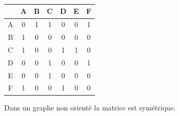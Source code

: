 \documentclass[svgnames,11pt]{beamer}
\begin{document}
\begin{frame}
    \frametitle{}

    \begin{center}
        \begin{tabular}{c|*{6}{c}}
              & A                      & B                       & C                    & D & E & F \\
            \hline
            A & 0                      & \cellcolor{LightGray} 1 & \cellcolor{SkyBlue}1 & 0 & 0 & 1 \\
            B & \cellcolor{LightGray}1 & 0                       & 0                    & 0 & 0 & 0 \\
            C & \cellcolor{SkyBlue}1   & 0                       & 0                    & 1 & 1 & 0 \\
            D & 0                      & 0                       & 1                    & 0 & 0 & 1 \\
            E & 0                      & 0                       & 1                    & 0 & 0 & 0 \\
            F & 1                      & 0                       & 0                    & 1 & 0 & 0 \\
        \end{tabular}
    \end{center}
    \begin{aretenir}[Remarque]
        Dans un graphe non orienté la matrice est symétrique.
    \end{aretenir}
\end{frame}
\end{document}
